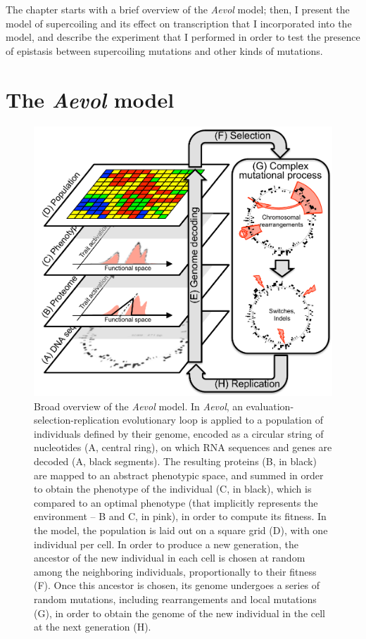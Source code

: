 The chapter starts with a brief overview of the \emph{Aevol} model; then, I present the model of supercoiling and its effect on transcription that I incorporated into the model, and describe the experiment that I performed in order to test the presence of epistasis between supercoiling mutations and other kinds of mutations.

\section{The \emph{Aevol} model}
\label{sec:aevol:model}

\begin{figure}
\includegraphics[width=\textwidth]{aevol/images/aevol.pdf}
\caption[Overview of the \emph{Aevol} model]{Broad overview of the \emph{Aevol} model.
In \emph{Aevol}, an evaluation-selection-replication evolutionary loop is applied to a population of individuals defined by their genome, encoded as a circular string of nucleotides (A, central ring), on which RNA sequences and genes are decoded (A, black segments).
The resulting proteins (B, in black) are mapped to an abstract phenotypic space, and summed in order to obtain the phenotype of the individual (C, in black), which is compared to an optimal phenotype (that implicitly represents the environment -- B and C, in pink), in order to compute its fitness.
In the model, the population is laid out on a square grid (D), with one individual per cell.
In order to produce a new generation, the ancestor of the new individual in each cell is chosen at random among the neighboring individuals, proportionally to their fitness (F).
Once this ancestor is chosen, its genome undergoes a series of random mutations, including rearrangements and local mutations (G), in order to obtain the genome of the new individual in the cell at the next generation (H).
}
\label{fig:aevol:model}
\end{figure}


